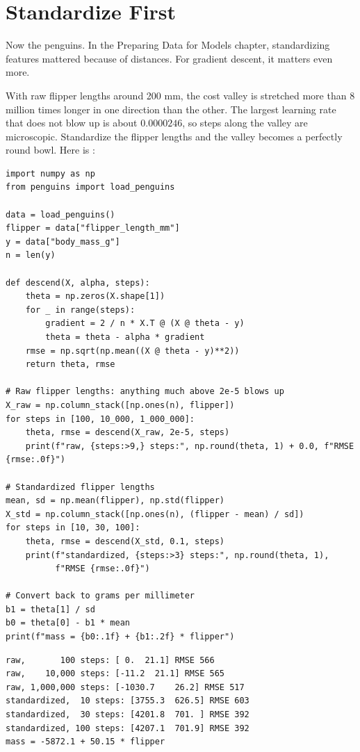 \section{Standardize First}
Now the penguins. In the Preparing Data for Models chapter, standardizing features mattered because of
distances. For gradient descent, it matters even more.

With raw flipper lengths around 200 mm, the cost valley is stretched more than 8 million times longer in one
direction than the other. The largest learning rate that does not blow up is about $0.0000246$, so steps along
the valley are microscopic. Standardize the flipper lengths and the valley becomes a perfectly round bowl.
Here is :

\begin{verbatim}
import numpy as np
from penguins import load_penguins

data = load_penguins()
flipper = data["flipper_length_mm"]
y = data["body_mass_g"]
n = len(y)

def descend(X, alpha, steps):
    theta = np.zeros(X.shape[1])
    for _ in range(steps):
        gradient = 2 / n * X.T @ (X @ theta - y)
        theta = theta - alpha * gradient
    rmse = np.sqrt(np.mean((X @ theta - y)**2))
    return theta, rmse

# Raw flipper lengths: anything much above 2e-5 blows up
X_raw = np.column_stack([np.ones(n), flipper])
for steps in [100, 10_000, 1_000_000]:
    theta, rmse = descend(X_raw, 2e-5, steps)
    print(f"raw, {steps:>9,} steps:", np.round(theta, 1) + 0.0, f"RMSE {rmse:.0f}")

# Standardized flipper lengths
mean, sd = np.mean(flipper), np.std(flipper)
X_std = np.column_stack([np.ones(n), (flipper - mean) / sd])
for steps in [10, 30, 100]:
    theta, rmse = descend(X_std, 0.1, steps)
    print(f"standardized, {steps:>3} steps:", np.round(theta, 1),
          f"RMSE {rmse:.0f}")

# Convert back to grams per millimeter
b1 = theta[1] / sd
b0 = theta[0] - b1 * mean
print(f"mass = {b0:.1f} + {b1:.2f} * flipper")
\end{verbatim}

\begin{verbatim}
raw,       100 steps: [ 0.  21.1] RMSE 566
raw,    10,000 steps: [-11.2  21.1] RMSE 565
raw, 1,000,000 steps: [-1030.7    26.2] RMSE 517
standardized,  10 steps: [3755.3  626.5] RMSE 603
standardized,  30 steps: [4201.8  701. ] RMSE 392
standardized, 100 steps: [4207.1  701.9] RMSE 392
mass = -5872.1 + 50.15 * flipper
\end{verbatim}

